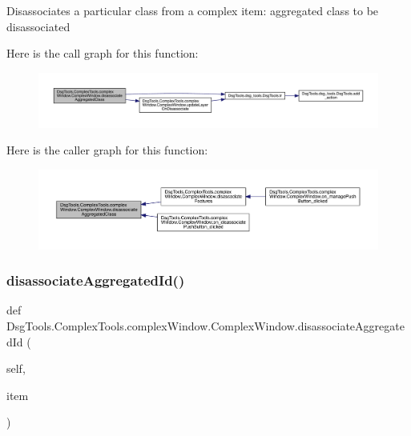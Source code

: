 \begin{DoxyVerb}Disassociates a particular class from a complex
item: aggregated class to be disassociated
\end{DoxyVerb}
 Here is the call graph for this function\+:
\nopagebreak
\begin{figure}[H]
\begin{center}
\leavevmode
\includegraphics[width=350pt]{class_dsg_tools_1_1_complex_tools_1_1complex_window_1_1_complex_window_a7303c98e007e37e70497c56e877487c6_cgraph}
\end{center}
\end{figure}
Here is the caller graph for this function\+:
\nopagebreak
\begin{figure}[H]
\begin{center}
\leavevmode
\includegraphics[width=350pt]{class_dsg_tools_1_1_complex_tools_1_1complex_window_1_1_complex_window_a7303c98e007e37e70497c56e877487c6_icgraph}
\end{center}
\end{figure}
\mbox{\label{class_dsg_tools_1_1_complex_tools_1_1complex_window_1_1_complex_window_a368acb25b3069036d4970c74c8123c6f}} 
\subsubsection{\texorpdfstring{disassociate\+Aggregated\+Id()}{disassociateAggregatedId()}}
{\footnotesize\ttfamily def Dsg\+Tools.\+Complex\+Tools.\+complex\+Window.\+Complex\+Window.\+disassociate\+Aggregated\+Id (\begin{DoxyParamCaption}\item[{}]{self,  }\item[{}]{item }\end{DoxyParamCaption})}

